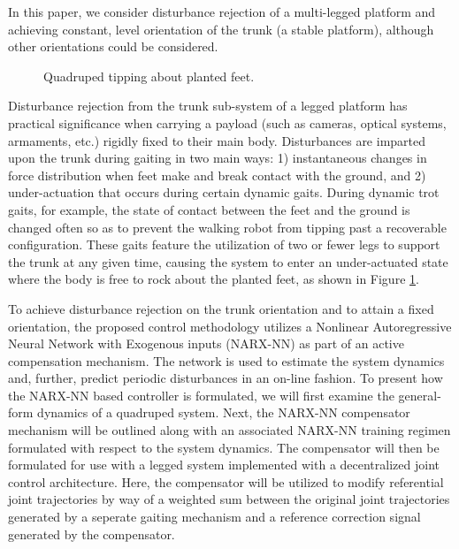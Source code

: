 In this paper, we consider disturbance rejection of a multi-legged platform and achieving constant, level orientation of the trunk (\IE a stable platform), although other orientations could be considered. 
	\begin{figure}[t!]
		\vspace{2mm}
		\centering
		\caption{ Quadruped tipping about planted feet.}
		\label{fig::quadruped_walking}
		\vspace{-7mm}
	\end{figure}
Disturbance rejection from the trunk sub-system of a legged platform has practical significance when carrying a payload (such as cameras, optical systems, armaments, etc.) rigidly fixed to their main body. Disturbances are imparted upon the trunk during gaiting in two main ways: 1) instantaneous changes in force distribution when feet make and break contact with the ground, and 2) under-actuation that occurs during certain dynamic gaits. During dynamic trot gaits, for example, the state of contact between the feet and the ground is changed often so as to prevent the walking robot from tipping past a recoverable configuration. These gaits feature the utilization of two or fewer legs to support the trunk at any given time, causing the system to enter an under-actuated state where the body is free to rock about the planted feet, as shown in Figure \ref{fig::quadruped_walking}.

To achieve disturbance rejection on the trunk orientation and to attain a fixed orientation, the proposed control methodology utilizes a Nonlinear Autoregressive Neural Network with Exogenous inputs (NARX-NN) as part of an active compensation mechanism. The network is used to estimate the system dynamics and, further, predict periodic disturbances in an on-line fashion. To present how the NARX-NN based controller is formulated, we will first examine the general-form dynamics of a quadruped system. Next, the NARX-NN compensator mechanism will be outlined along with an associated NARX-NN training regimen formulated with respect to the system dynamics. The compensator will then be formulated for use with a legged system implemented with a decentralized joint control architecture. Here, the compensator will be utilized to modify referential joint trajectories by way of a weighted sum between the original joint trajectories generated by a seperate gaiting mechanism and a reference correction signal generated by the compensator.

